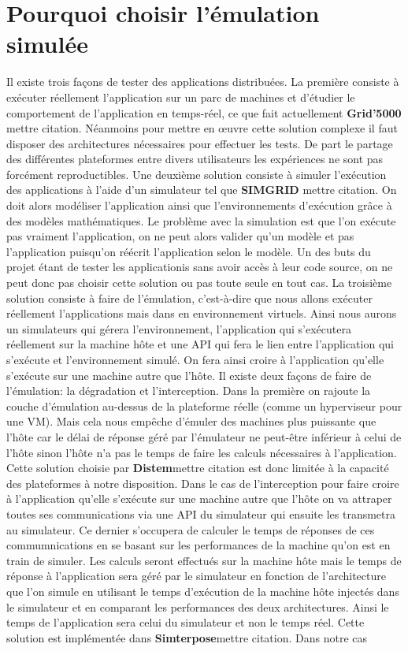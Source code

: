 \section{Pourquoi choisir l'émulation simulée}

Il existe trois façons de tester des applications distribuées. La première consiste à exécuter réellement l'application sur un parc de machines et d'étudier le comportement de l'application en temps-réel, ce que fait actuellement \textbf{Grid'5000} {\color{red}mettre citation}. Néanmoins pour mettre en \oe uvre cette solution complexe il faut disposer des architectures nécessaires pour effectuer les tests. De part le partage des différentes plateformes entre divers utilisateurs les expériences ne sont pas forcément reproductibles. Une deuxième solution consiste à simuler l'exécution des applications à l'aide d'un simulateur tel que \textbf{SIMGRID} {\color{red}mettre citation}. On doit alors modéliser l'application ainsi que l'environnements d'exécution grâce à des modèles mathématiques. Le problème avec la simulation est que l'on exécute pas vraiment l'application, on ne peut alors valider qu'un modèle et pas l'application puisqu'on réécrit l'application selon le modèle. Un des buts du projet étant de tester les applicationis sans avoir accès à leur code source, on ne peut donc pas choisir cette solution ou pas toute seule en tout cas. La troisième solution consiste à faire de l'émulation, c'est-à-dire que nous allons exécuter réellement l'applications mais dans en environnement virtuels. Ainsi nous aurons un simulateurs qui gérera l'environnement, l'application qui s'exécutera réellement sur la machine hôte et une API qui fera le lien entre l'application qui s'exécute et l'environnement simulé. On fera ainsi croire à l'application qu'elle s'exécute sur une machine autre que l'hôte. Il existe deux façons de faire de l'émulation: la dégradation et l'interception. Dans la première on rajoute la couche d'émulation au-dessus de la plateforme réelle (comme un hyperviseur pour une VM). Mais cela nous empêche d'émuler des machines plus puissante que l'hôte car le délai de réponse géré par l'émulateur ne peut-être inférieur à celui de l'hôte sinon l'hôte n'a pas le temps de faire les calculs nécessaires à l'application. Cette solution choisie par \textbf{Distem}{\color{red}mettre citation} est donc limitée à la capacité des plateformes à notre disposition. Dans le cas de l'interception pour faire croire à l'application qu'elle s'exécute sur une machine autre que l'hôte on va attraper toutes ses communications via une API du simulateur qui ensuite les transmetra au simulateur. Ce dernier s'occupera de calculer le temps de réponses de ces commumnications en se basant sur les performances de la machine qu'on est en train de simuler. Les calculs seront effectués sur la machine hôte mais le temps de réponse à l'application sera géré par le simulateur en fonction de l'architecture que l'on simule en utilisant le temps d'exécution de la machine hôte injectés dans le simulateur et en comparant les performances des deux architectures. Ainsi le temps de l'application sera celui du simulateur et non le temps réel. Cette solution est implémentée dans \textbf{Simterpose}{\color{red}mettre citation}. Dans notre cas 